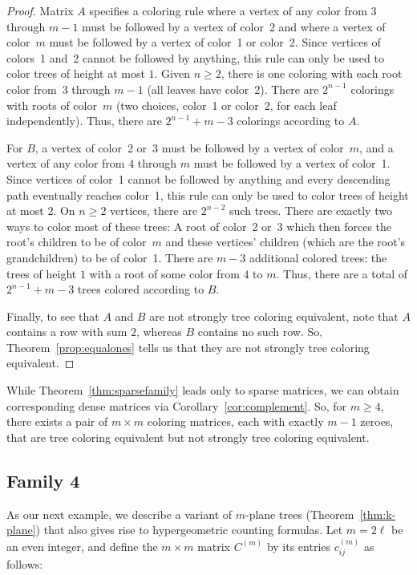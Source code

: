 \documentclass[12pt]{amsart}
\begin{document}
\begin{proof}
        Matrix $A$ specifies a coloring rule where a vertex of any color from 3 through $m-1$ must be followed by a vertex of color~2 and where a vertex of color~$m$ must be followed by a vertex of color~1 or color~2. Since vertices of colors~1 and~2 cannot be followed by anything, this rule can only be used to color trees of height at most  $1$. Given $n\geq2$, there is one coloring with each root color from~3 through $m-1$ (all leaves have color~2). There are $2^{n-1}$ colorings with roots of color~$m$ (two choices, color~1 or color~2, for each leaf independently). Thus, there are $2^{n-1}+m-3$ colorings according to $A$.
        
        For $B$, a vertex of color~2 or~3 must be followed by a vertex of color~$m$, and a vertex of any color from $4$ through $m$ must be followed by a vertex of color~1. Since vertices of color~1 cannot be followed by anything and every descending path eventually reaches color~1, this rule can only be used to color trees of height at most $2$. On $n\geq2$ vertices, there are $2^{n-2}$ such trees. There are exactly two ways to color most of these trees: A root of color~2 or~3 which then forces the root's children to be of color~$m$ and these vertices' children (which are the root's grandchildren) to be of color~1. There are $m-3$ additional colored trees: the trees of height $1$ with a root of some color from $4$ to $m$. Thus, there are a total of $2^{n-1}+m-3$ trees colored according to $B$.

        Finally, to see that $A$ and $B$ are not strongly tree coloring equivalent, note that $A$ contains a row with sum $2$, whereas $B$ contains no such row. 
        So, Theorem~\ref{prop:equalones} tells us that they are not strongly tree coloring equivalent.
    \end{proof}

    While Theorem~\ref{thm:sparsefamily} leads only to sparse matrices, we can obtain corresponding dense matrices via Corollary~\ref{cor:complement}. So, for $m\geq4$, there exists a pair of $m\times m$ coloring matrices, each with exactly $m-1$ zeroes, that are tree coloring equivalent but not strongly tree coloring equivalent.

\subsection{Family 4}

As our next example, we describe a variant of $m$-plane trees (Theorem~\ref{thm:k-plane}) that also gives rise to hypergeometric counting formulas. Let $m = 2\ell$ be an even integer, and define the $m \times m$ matrix $C^{(m)}$ by its entries $c_{ij}^{(m)}$ as follows:
\end{document}
